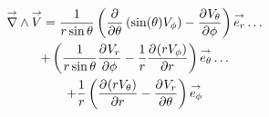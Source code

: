     \begin{multline}
        \vrot \vect{V} = \frac{1}{r\sin\theta}\left(\ddr{\theta}{}\left(\sin(\theta)V_\phi\right) - \ddr{\phi}{V_\theta}\right)\vect{e_r}\dots
        \\
        + \left(\frac{1}{r\sin\theta}\ddr{\phi}{V_r} - \frac{1}{r}\ddr{r}{(rV_\phi)} \right)\vect{e_\theta} \dots
        \\
        + \frac{1}{r}\left(\ddr{r}{(rV_\theta)}-\ddr{\theta}{V_r}\right)\vect{e_\phi}
    \end{multline}